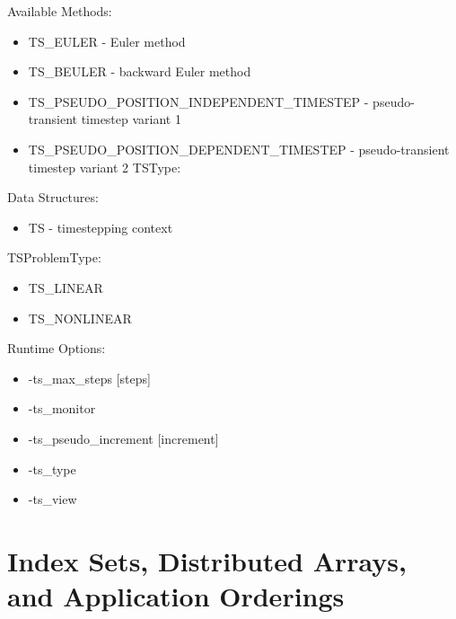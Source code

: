 {\noindent
Available Methods: 
\begin{itemize}
\item TS\_EULER - Euler method
\item TS\_BEULER - backward Euler method
\item TS\_PSEUDO\_POSITION\_INDEPENDENT\_TIMESTEP - pseudo-transient timestep variant 1
\item TS\_PSEUDO\_POSITION\_DEPENDENT\_TIMESTEP - pseudo-transient timestep variant 2
TSType: 
\end{itemize}
Data Structures:
\begin{itemize}
\item TS - timestepping context
\end{itemize}
TSProblemType:
\begin{itemize}
\item TS\_LINEAR
\item TS\_NONLINEAR
\end{itemize}
Runtime Options:
\begin{itemize}
\item -ts\_max\_steps [steps]
\item -ts\_monitor
\item -ts\_pseudo\_increment [increment]
\item -ts\_type
\item -ts\_view
\end{itemize}


{\footnotesize
\noindent

}

\section{Index Sets, Distributed Arrays, and Application Orderings}

}
